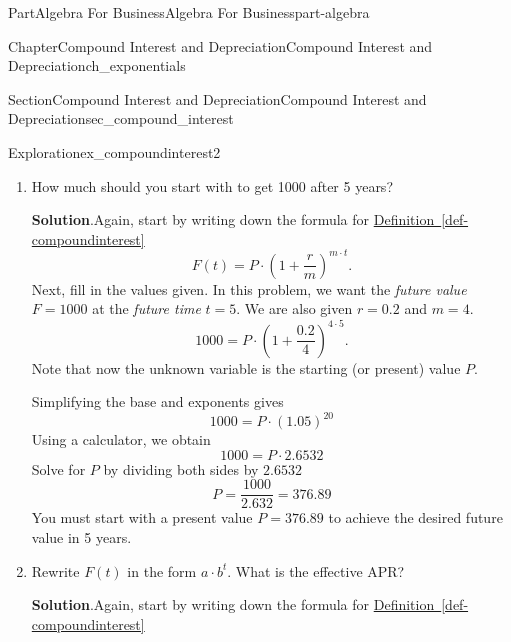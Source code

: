 \documentclass[oneside,10pt,]{tufte-book}
\newcommand{\blocktitlefont}{\relax}
\newcommand{\xreffont}{\relax}
\numberwithin{equation}{chapter}
\begin{document}
\begin{partptx}{Part}{Algebra For Business}{}{Algebra For Business}{}{}{part-algebra}
\begin{chapterptx}{Chapter}{Compound Interest and Depreciation}{}{Compound Interest and Depreciation}{}{}{ch_exponentials}
\begin{sectionptx}{Section}{Compound Interest and Depreciation}{}{Compound Interest and Depreciation}{}{}{sec_compound_interest}
\begin{exploration}{Exploration}{}{ex_compoundinterest2}
\begin{enumerate}[font=\bfseries,label=(\alph*),ref=\alph*]
We could stop there, but it is often nice to clean this up by  simplifying the base of the exponent to get a formula for the value after \(t\) years%
\begin{equation*}
F(t) = 100 \cdot \left(1.05 \right)^{4\cdot t}
\end{equation*}
%
\par
To find the value after one year, plug in \(t=1\) and simplify,%
\begin{equation*}
F(1) = 100 \cdot \left(1.05 \right)^{4\cdot 1} = \dots = 100\cdot 1.2155 = 121.55
\end{equation*}
%
\item{}How much should you start with to get \textdollar{}1000 after 5 years?%
\par\smallskip%
\noindent\textbf{\blocktitlefont Solution}.\hypertarget{ex_compoundinterest2-3-2}{}\quad{}Again, start by writing down the formula for  \hyperref[def-compoundinterest]{Definition~{\xreffont\ref{def-compoundinterest}}}%
\begin{equation*}
F(t) = P \cdot \left(1 + \frac{r}{m}\right)^{m\cdot t}\text{.}
\end{equation*}
Next, fill in the values given.  In this problem, we want the \emph{future value} \(F=1000\) at the \emph{future time} \(t=5\). We are also given \(r=0.2\) and \(m=4\).%
\begin{equation*}
1000 = P \cdot \left(1 + \frac{0.2}{4}\right)^{4\cdot 5}\text{.}
\end{equation*}
Note that now the unknown variable is the starting (or present) value \(P\).%
\par
Simplifying the base and exponents gives%
\begin{equation*}
1000 = P \cdot \left(1.05\right)^{20}
\end{equation*}
Using a calculator, we obtain%
\begin{equation*}
1000 = P \cdot 2.6532
\end{equation*}
Solve for \(P\) by dividing both sides by \(2.6532\)%
\begin{equation*}
P = \dfrac{1000}{2.632} = 376.89
\end{equation*}
You must start with a present value \(P=376.89\) to achieve the desired future value in 5 years.%
\item{}Rewrite \(F(t)\) in the form \(a\cdot b^t\).  What is the effective APR?%
\par\smallskip%
\noindent\textbf{\blocktitlefont Solution}.\hypertarget{ex_compoundinterest2-4-2}{}\quad{}Again, start by writing down the formula for  \hyperref[def-compoundinterest]{Definition~{\xreffont\ref{def-compoundinterest}}}%

\end{enumerate}
\end{exploration}
\end{sectionptx}
\end{chapterptx}
\end{partptx}
\end{document}
